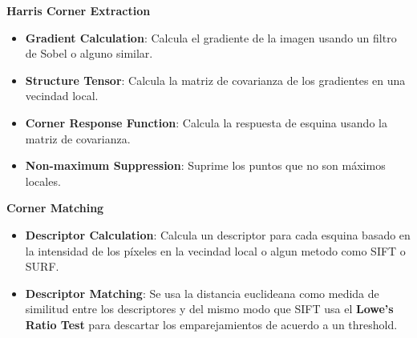 \documentclass{article}
\begin{document}
\textbf{Harris Corner Extraction}

\begin{itemize}
    \item \textbf{Gradient Calculation}: Calcula el gradiente de la imagen usando un filtro de Sobel o alguno similar.
    \item \textbf{Structure Tensor}: Calcula la matriz de covarianza de los gradientes en una vecindad local.
    \item \textbf{Corner Response Function}: Calcula la respuesta de esquina usando la matriz de covarianza.
    \item \textbf{Non-maximum Suppression}: Suprime los puntos que no son máximos locales.
\end{itemize}

\textbf{Corner Matching}

\begin{itemize}
    \item \textbf{Descriptor Calculation}: Calcula un descriptor para cada esquina basado en la intensidad de los píxeles en la vecindad local o algun metodo como SIFT o SURF.
    \item \textbf{Descriptor Matching}: Se usa la distancia euclideana como medida de similitud entre los descriptores y del mismo modo que SIFT usa el \textbf{Lowe's Ratio Test} para descartar los emparejamientos de acuerdo a un threshold.
\end{itemize}
\end{document}
